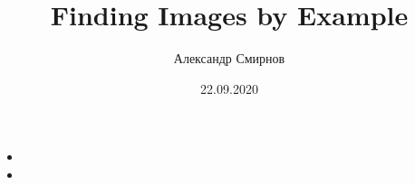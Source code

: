 \documentclass[xetex,mathserif,serif]{beamer}
\title{Finding Images by Example}
\author[Александр Смирнов]{Александр Смирнов}
\date{22.09.2020}
\begin{document}
\begin{frame}
	\titlepage{}
\end{frame}


\begin{frame}
	\frametitle{}

	\begin{itemize}
		\item 
		\item 
	\end{itemize}
\end{frame}
\end{document}
